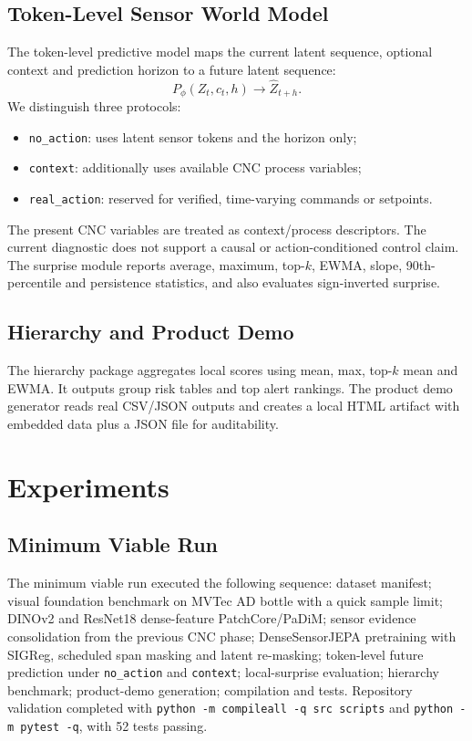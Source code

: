 \documentclass[10pt,conference]{IEEEtran}
\begin{document}
\subsection{Token-Level Sensor World Model}
The token-level predictive model maps the current latent sequence, optional context and prediction horizon to a future latent sequence:
\begin{equation}
P_\phi(Z_t,c_t,h) \rightarrow \hat{Z}_{t+h}.
\end{equation}
We distinguish three protocols:
\begin{itemize}
  \item \texttt{no\_action}: uses latent sensor tokens and the horizon only;
  \item \texttt{context}: additionally uses available CNC process variables;
  \item \texttt{real\_action}: reserved for verified, time-varying commands or setpoints.
\end{itemize}
The present CNC variables are treated as context/process descriptors. The current diagnostic does not support a causal or action-conditioned control claim. The surprise module reports average, maximum, top-$k$, EWMA, slope, 90th-percentile and persistence statistics, and also evaluates sign-inverted surprise.

\subsection{Hierarchy and Product Demo}
The hierarchy package aggregates local scores using mean, max, top-$k$ mean and EWMA. It outputs group risk tables and top alert rankings. The product demo generator reads real CSV/JSON outputs and creates a local HTML artifact with embedded data plus a JSON file for auditability.

\section{Experiments}
\subsection{Minimum Viable Run}
The minimum viable run executed the following sequence: dataset manifest; visual foundation benchmark on MVTec AD bottle with a quick sample limit; DINOv2 and ResNet18 dense-feature PatchCore/PaDiM; sensor evidence consolidation from the previous CNC phase; DenseSensorJEPA pretraining with SIGReg, scheduled span masking and latent re-masking; token-level future prediction under \texttt{no\_action} and \texttt{context}; local-surprise evaluation; hierarchy benchmark; product-demo generation; compilation and tests. Repository validation completed with \texttt{python -m compileall -q src scripts} and \texttt{python -m pytest -q}, with 52 tests passing.
\end{document}

